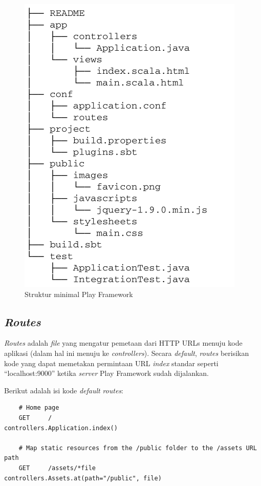 \begin{figure}[htbp]
	\centering
		\includegraphics[scale=0.7]{Gambar/2_strukturplay.PNG}
	\caption{Struktur minimal Play Framework}
	\label{fig:2_strukturplay}
\end{figure}

\subsection{\textit{Routes}}
\label{sec:routes}
\textit{Routes} adalah \textit{file} yang mengatur pemetaan dari HTTP URLs menuju kode aplikasi (dalam hal ini menuju ke \textit{controllers}). Secara \textit{default}, \textit{routes} berisikan kode yang dapat memetakan permintaan URL \textit{index} standar seperti ``localhost:9000'' ketika \textit{server} Play Framework sudah dijalankan.

Berikut adalah isi kode \textit{default} \textit{routes}:

\begin{lstlisting}
	# Home page
	GET     /                           controllers.Application.index()

	# Map static resources from the /public folder to the /assets URL path
	GET     /assets/*file               controllers.Assets.at(path="/public", file)
\end{lstlisting}

